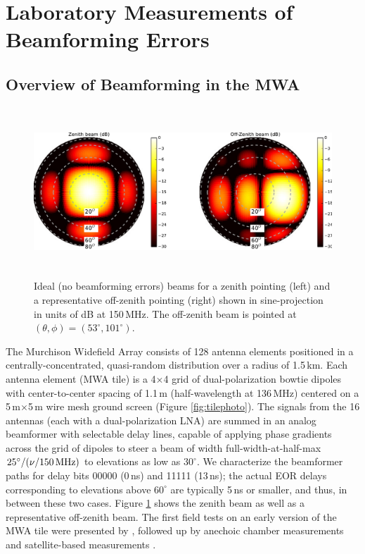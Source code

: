 \section{Laboratory Measurements of Beamforming Errors}
\label{sec:measurements}

\subsection{Overview of Beamforming in the MWA}

 \begin{figure}[t]
 \centering
\includegraphics[height=2.5in]{chap2_beamforming_errors/zenith_and_offzenith_beams-eps-converted-to.pdf}
\caption[Ideal (no beamforming errors) beams for zenith (left) and off-zenith (right) pointings.]{Ideal (no beamforming errors) beams for a zenith pointing (left) and a representative off-zenith pointing (right) shown in sine-projection in units of dB at 150\,MHz. The off-zenith beam is pointed at $(\theta,\phi) = (53^\circ,101^\circ)$. }
\label{fig:idealbeams}
\end{figure}

The Murchison Widefield Array consists of 128 antenna elements positioned in a centrally-concentrated, quasi-random distribution over a radius of 1.5\,km. Each antenna element (MWA tile) is a 4$\times$4 grid of dual-polarization bowtie dipoles with center-to-center spacing of 1.1\,m (half-wavelength at 136\,MHz) centered on a 5\,m$ \times $5\,m wire mesh ground screen (Figure \ref{fig:tilephoto}). The signals from the 16 antennas (each with a dual-polarization LNA) are summed in an analog beamformer with selectable delay lines, capable of applying phase gradients across the grid of dipoles to steer a beam of width full-width-at-half-max $25^\circ/(\nu/150\text{\,MHz})$ to elevations as low as $30^\circ$. We characterize the beamformer paths for delay bits 00000 (0\,ns) and 11111 (13\,ns); the actual EOR delays corresponding to elevations above $60^\circ$ are typically 5\,ns or smaller, and thus, in between these two cases. Figure \ref{fig:idealbeams} shows the zenith beam as well as a representative off-zenith beam. The first field tests on an early version of the MWA tile were presented by \citet{bowman07}, followed up by anechoic chamber measurements \citep{williamsthesis2012} and satellite-based measurements  \citep{neben15}.

